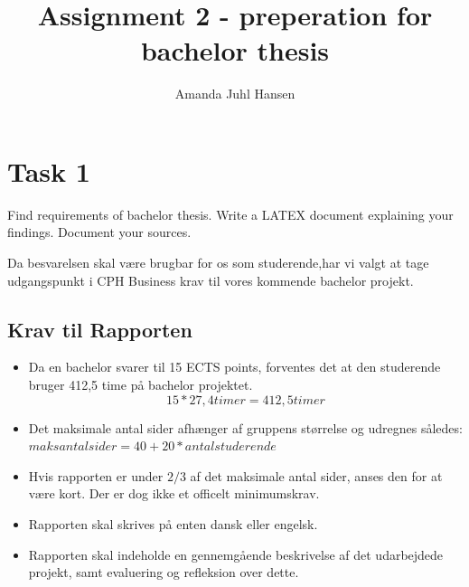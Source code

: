 \documentclass{article}
\author{Amanda Juhl Hansen}
\title{Assignment 2 - preperation for bachelor thesis}
\begin{document}
\clearpage\maketitle
\thispagestyle{empty}
\newpage
\tableofcontents
\listoffigures
\listoftables

\newpage
    \section{Task 1}
    
    Find requirements of bachelor thesis. Write a LATEX document explaining your
    findings. Document your sources.
    \newline 

    Da besvarelsen skal være brugbar for os som studerende,har vi valgt at tage udgangspunkt i CPH Business krav til vores kommende bachelor projekt. \cite{softwebsite}

    \subsection*{Krav til Rapporten}
    \begin{itemize}
        \item Da en bachelor svarer til 15 ECTS points, forventes det at den studerende bruger 412,5 time på bachelor projektet.  
            \[ 15 * 27,4 timer = 412,5 timer \]
        \item Det maksimale antal sider afhænger af gruppens størrelse og udregnes således: \(maksantalsider = 40 + 20 * antalstuderende\)
        \item Hvis rapporten er under \(2/3\) af det maksimale antal sider, anses den for at være kort. Der er dog ikke et officelt minimumskrav.  
        \item Rapporten skal skrives på enten dansk eller engelsk.
        \item Rapporten skal indeholde en gennemgående beskrivelse af det udarbejdede projekt, samt evaluering og refleksion over dette.
    \end{itemize}
\end{document}

